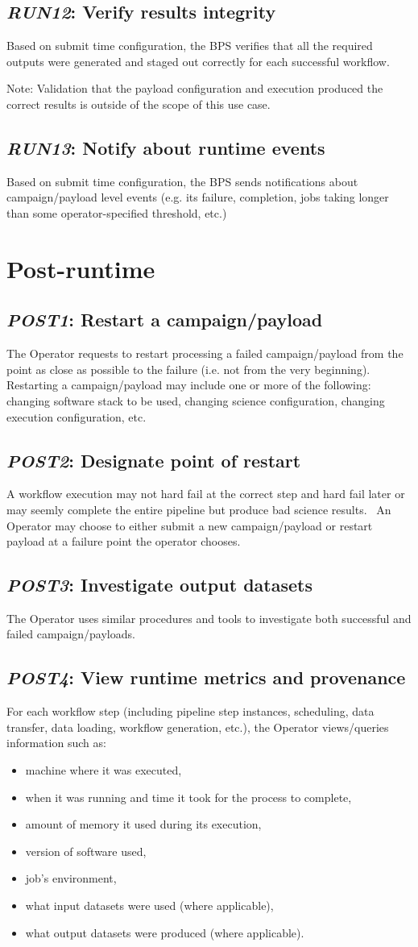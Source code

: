 \documentclass[DM,toc]{lsstdoc}
\newcommand{\usecase}[2]{\subsection{\emph{#1}: #2}\label{use:#1}}
\begin{document}
\usecase{RUN12}{Verify results integrity}
Based on submit time configuration, the BPS verifies that all the required
outputs were generated and staged out correctly for each successful workflow.

Note: Validation that the payload configuration and execution produced the
correct results is outside of the scope of this use case.

\usecase{RUN13}{Notify about runtime events}
Based on submit time configuration, the BPS sends notifications about
campaign/payload level events (e.g.  its failure, completion, jobs taking
longer than some operator-specified threshold, etc.)


\section{Post-runtime}

\usecase{POST1}{Restart a campaign/payload}
The Operator requests to restart processing a failed campaign/payload from the
point as close as possible to the failure (i.e. not from the very beginning).
Restarting a campaign/payload may include one or more of the following:
changing software stack to be used, changing science configuration, changing
execution configuration, etc.

\usecase{POST2}{Designate point of restart}
A workflow execution may not hard fail at the correct step and hard fail later
or may seemly complete the entire pipeline but produce bad science results.  An
Operator may choose to either submit a new campaign/payload or restart payload
at a failure point the operator chooses.

\usecase{POST3}{Investigate output datasets}
The Operator uses similar procedures and tools to investigate both
successful and failed campaign/payloads.

\usecase{POST4}{View runtime metrics and provenance}
For each workflow step (including pipeline step instances, scheduling, data
transfer, data loading, workflow generation, etc.), the Operator views/queries
information such as:

\begin{itemize}
  \item
    machine where it was executed,
  \item
    when it was running and time it took for the process to complete,
  \item
    amount of memory it used during its execution,
  \item
    version of software used,
  \item
    job's environment,
  \item
    what input datasets were used (where applicable),
  \item
    what output datasets were produced (where applicable).
\end{itemize}
\end{document}
